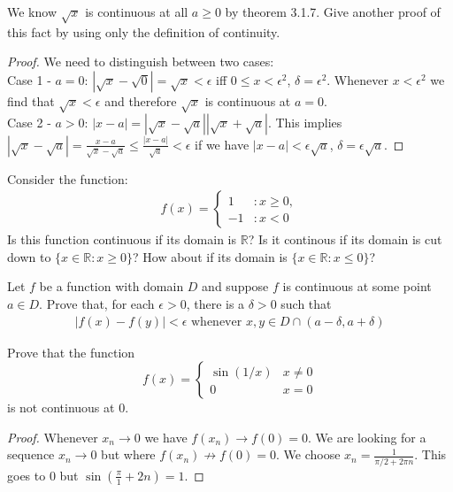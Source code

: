 \documentclass[12pt]{book}
\newcommand{\R}{\mathbb{R}}
\newenvironment{exercise}[2][Exercise]{\begin{trivlist}
\item[\hskip \labelsep {\bfseries #1}\hskip \labelsep {\bfseries #2.}]}{\end{trivlist}}
\begin{document}
\begin{exercise}{3.1.8}
    We know $\sqrt{x}$ is continuous at all $a \geq 0$ by theorem 3.1.7. Give another proof of this fact by using only the definition of continuity. 
    
    \begin{proof}
    We need to distinguish between two cases: \\
    Case 1 - $a= 0$: $|\sqrt{x} - \sqrt{0}| = \sqrt{x} < \epsilon$ iff $0 \leq x < \epsilon^2$, $\delta=\epsilon^2$. Whenever $x<\epsilon^2$ we find that $\sqrt{x}< \epsilon$ and therefore $\sqrt{x}$ is continuous at $a=0$. \\
    Case 2 - $a>0$: $|x-a|=|\sqrt{x}-\sqrt{a}| |\sqrt{x}+\sqrt{a}|$. This implies $|\sqrt{x}-\sqrt{a}| = \frac{x-a}{\sqrt{x}-\sqrt{a}} \leq \frac{|x-a|}{\sqrt{a}} < \epsilon$ if we have $|x-a| < \epsilon \sqrt{a}$, $\delta=\epsilon \sqrt{a}$.
    \end{proof}
\end{exercise}

\begin{exercise}{3.1.9}
Consider the function:
	\begin{align*}
	f(x) = \left\{
     \begin{array}{lr}
       1 & : x \geq 0,\\
       -1 & : x < 0
     \end{array}
   \right.
	\end{align*}
Is this function continuous if its domain is $\R$? Is it continous if its domain is cut down to $\{ x\in \R: x \geq 0 \}$? How about if its domain is $\{x \in \R : x \leq 0 \}$?
\end{exercise}

\begin{exercise}{3.1.10}
Let $f$ be a function with domain $D$ and suppose $f$ is continuous at some point $a \in D$. Prove that, for each $\epsilon >0$, there is a $\delta >0$ such that
	\begin{align*}
	|f(x) - f(y) | < \epsilon \text{ whenever } x,y \in D \cap (a-\delta,a+ \delta)
	\end{align*}
\end{exercise}

\begin{exercise}{3.1.11}
    Prove that the function
        \[ f(x)= \begin{cases} \sin (1/x) & x\neq 0 \\ 0 & x =0 \end{cases} \]
    is not continuous at 0.
    
    \begin{proof}
    Whenever $x_n \to 0$ we have $f(x_n) \to f(0) = 0$. We are looking for a sequence $x_n \to 0$ but where $f(x_n) \not\to f(0)=0$. We choose $x_n = \frac{1}{\pi/2 + 2 \pi n}$. This goes to 0 but $\sin(\frac{\pi}{1} +2n)=1$.
    \end{proof}
\end{exercise}
\end{document}
